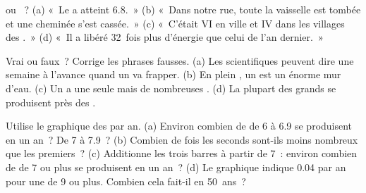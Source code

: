 \begin{exercise}[$\star$]\label{exo:g7:earthquakes:3}
 ou ~? (a) «~Le  a atteint 6.8.~» (b) «~Dans notre
rue, toute la vaisselle est tombée et une cheminée s'est cassée.~» (c)
«~C'était VI en ville et IV dans les villages des .~» (d) «~Il a
libéré 32~fois plus d'énergie que celui de l'an dernier.~»
\end{exercise}

\begin{exercise}[$\star$]\label{exo:g7:earthquakes:4}
Vrai ou faux~? Corrige les phrases fausses. (a) Les scientifiques peuvent
dire une semaine à l'avance quand un  va frapper. (b) En plein
, un  est un énorme mur d'eau. (c) Un  a une seule
 mais de nombreuses . (d) La plupart des grands 
se produisent près des .
\end{exercise}

\begin{exercise}[$\star\star$]\label{exo:g7:earthquakes:5}
Utilise le graphique des  par an. (a) Environ combien de  de
 6 à 6.9 se produisent en un an~? De  7 à 7.9~? (b)
Combien de fois les seconds sont-ils moins nombreux que les premiers~?
(c) Additionne les trois barres à partir de 7~: environ combien de
 de  7 ou plus se produisent en un an~? (d) Le graphique
indique 0.04 par an pour une  de 9 ou plus. Combien cela
fait-il en 50~ans~?
\end{exercise}

